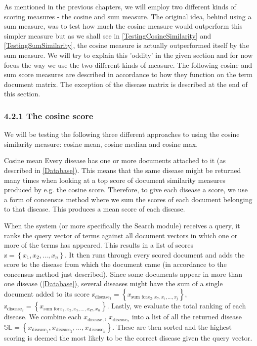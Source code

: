As mentioned in the previous chapters, we will employ two different kinds of scoring measures - the cosine and sum measure. The original idea, behind using a sum measure, was to test how much the cosine measure would outperform this simpler measure but as we shall see in \ref{TestingCosineSimilarity} and \ref{TestingSumSimilarity}, the cosine measure is actually outperformed itself by the sum measure. We will try to explain this 'oddity' in the given section and for now focus the way we use the two different kinds of measure. The following cosine and sum score measures are described in accordance to how they function on the term document matrix. The exception of the disease matrix is described at the end of this section.

\subsubsection{4.2.1 The cosine score\label{CosineScore}}

We will be testing the following three different approaches to using the cosine similarity measure: cosine mean, cosine median and cosine max. 

Cosine mean
Every disease has one or more documents attached to it (as described in \ref{Database}). This means that the same disease might be returned many times when looking at a top score of document similarity measures produced by e.g. the cosine score. Therefore, to give each disease a score, we use a form of concensus method where we sum the scores of each document belonging to that disease. This produces a mean score of each disease. 

When the system (or more specifically the Search module) receives a
query, it ranks the query vector of terms against all document vectors
in which one or more of the terms has appeared. This results in a list
of scores $\mathbb{x} = \left\{x_1, x_2, \dots, x_n \right\}$. It then
runs through every scored document and adds the score to the disease
from which the document came (in accordance to the concensus method
just described). Since some documents appear in more than one disease
(\ref{Database}), several diseases might have the sum of a single
document added to its score $\mathbb{x}_{\textrm{disease}_{1}} =
  \left\{x_{\textrm{sum for} x_2, x_7, x_i, \dots, x_j}\right\}$,
  $\mathbb{x}_{\textrm{disease}_{2}} = \left\{x_{\textrm{sum for} x_1,
        x_2, x_9, \dots, x_47, x_n}\right\}$.  Lastly, we evaluate the
    total ranking of each disease. We combine each
    $x_{\textrm{disease}_1}$, $x_{\textrm{disease}_2}$ into a list of
    all the returned disease $\mathbb{SL} =
    \left\{x_{\textrm{disease}_1},x_{\textrm{disease}_2}, \dots,
      x_{\textrm{disease}_n}\right\}$. These are then sorted and the highest
      scoring is deemed the most likely to be the correct disease
      given the query vector.

